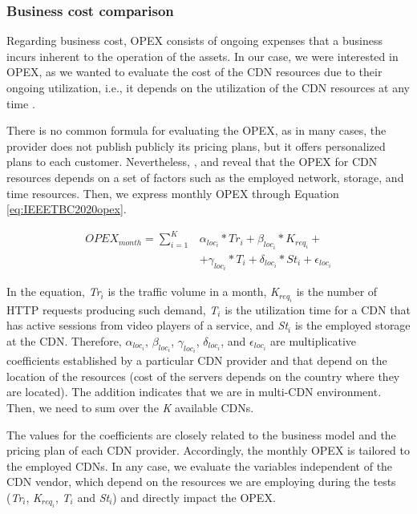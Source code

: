 \subsubsection{Business cost comparison}
\label{sec:metrics}

Regarding business cost, OPEX consists of ongoing expenses that a business incurs inherent to the operation of the assets. In our case, we were interested in OPEX, as we wanted to evaluate the cost of the CDN resources due to their ongoing utilization, i.e., it depends on the utilization of the CDN resources at any time \cite{verbrugge2006}.

There is no common formula for evaluating the OPEX, as in many cases, the provider does not publish publicly its pricing plans, but it offers personalized plans to each customer. Nevertheless, \cite{dacast2019}, \cite{CdnCalculator} and \cite{wowza} reveal that the OPEX for CDN resources depends on a set of factors such as the employed network, storage, and time resources. Then, we express monthly OPEX through Equation \ref{eq:IEEETBC2020opex}.

\begin{equation}
\label{eq:IEEETBC2020opex}
\begin{split}
OPEX_{month} = \sum_{i=1}^{K} & \alpha_{loc_i}*Tr_i + \beta_{loc_i}*K_{req_i} + \\
& + \gamma_{loc_i}*T_i + \delta_{loc_i}*St_i + \epsilon_{loc_i}
\end{split}
\end{equation}

In the equation, \textit{Tr$_i$} is the traffic volume in a month, \textit{K$_{req_i}$} is the number of HTTP requests producing such demand, \textit{T$_i$} is the utilization time for a CDN that has active sessions from video players of a service, and \textit{St$_i$} is the employed storage at the CDN. Therefore, $\alpha_{loc_i}$, $\beta_{loc_i}$, $\gamma_{loc_i}$, $\delta_{loc_i}$, and $\epsilon_{loc_i}$ are multiplicative coefficients established by a particular CDN provider and that depend on the location of the resources (cost of the servers depends on the country where they are located). The addition indicates that we are in multi-CDN environment. Then, we need to sum over the \textit{K} available CDNs.

The values for the coefficients are closely related to the business model and the pricing plan of each CDN provider. Accordingly, the monthly OPEX is tailored to the employed CDNs. In any case, we evaluate the variables independent of the CDN vendor, which depend on the resources we are employing during the tests (\textit{Tr$_i$}, \textit{K$_{req_i}$}, \textit{T$_i$} and \textit{St$_i$}) and directly impact the OPEX.

